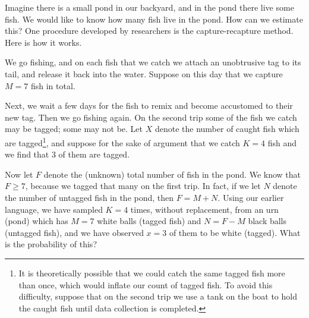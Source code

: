 \documentclass[]{book}
\let\rmarkdownfootnote\footnote%
\def\footnote{\protect\rmarkdownfootnote}
\numberwithin{equation}{chapter}
\numberwithin{figure}{chapter}
\theoremstyle{plain}
\theoremstyle{definition}
\theoremstyle{remark}
\theoremstyle{definition}
\theoremstyle{definition}
\theoremstyle{remark}
\let\BeginKnitrBlock\begin \let\EndKnitrBlock\end
\begin{document}
\bigskip

\BeginKnitrBlock{example}[Fishing, part one]
\protect\hypertarget{ex:how-many-fish}{}{\label{ex:how-many-fish}
\iffalse (Fishing, part one) \fi }Imagine there is a small pond in our
backyard, and in the pond there live some fish. We would like to know
how many fish live in the pond. How can we estimate this? One procedure
developed by researchers is the capture-recapture method. Here is how it
works.
\EndKnitrBlock{example}

We go fishing, and on each fish that we catch we attach an unobtrusive
tag to its tail, and release it back into the water. Suppose on this day
that we capture \(M=7\) fish in total.

Next, we wait a few days for the fish to remix and become accustomed to
their new tag. Then we go fishing again. On the second trip some of the
fish we catch may be tagged; some may not be. Let \(X\) denote the
number of caught fish which are tagged\footnote{It is theoretically
  possible that we could catch the same tagged fish more than once,
  which would inflate our count of tagged fish. To avoid this
  difficulty, suppose that on the second trip we use a tank on the boat
  to hold the caught fish until data collection is completed.}, and
suppose for the sake of argument that we catch \(K=4\) fish and we find
that 3 of them are tagged.

Now let \(F\) denote the (unknown) total number of fish in the pond. We
know that \(F\geq7\), because we tagged that many on the first trip. In
fact, if we let \(N\) denote the number of untagged fish in the pond,
then \(F=M+N\). Using our earlier language, we have sampled \(K=4\)
times, without replacement, from an urn (pond) which has \(M=7\) white
balls (tagged fish) and \(N=F-M\) black balls (untagged fish), and we
have observed \(x=3\) of them to be white (tagged). What is the
probability of this?
\end{document}
